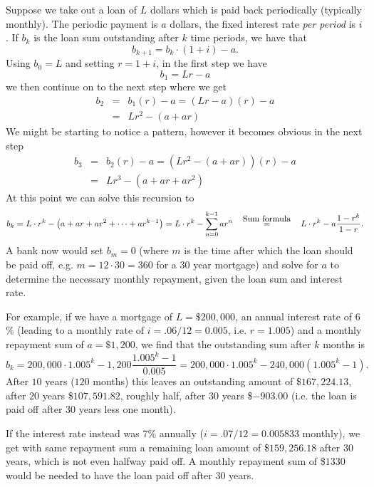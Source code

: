 \begin{Example}
Suppose we take out a loan of $L$ dollars which is paid back
periodically (typically monthly). The periodic payment is $a$
dollars, the fixed interest rate \textit{per period} is $i$. If
$b_k$ is the loan sum outstanding after $k$ time periods, we have
that
\[
b_{k+1}=b_k\cdot (1+i)-a.
\]
Using $b_0=L$ and setting $r=1+i$, in the first step we have
\[b_{1}=Lr-a\] we then continue on to the next step where we
get
\begin{eqnarray*}
b_{2}&=&b_{1}(r)-a 
=(Lr-a)(r)-a \\
&=&Lr^{2}-(a+ar)
\end{eqnarray*}
We might be starting to notice a pattern, however it becomes obvious
in the next step
\begin{eqnarray*}
b_{3}&=&b_{2}(r)-a 
=(Lr^{2}-(a+ar))(r)-a \\
&=&Lr^{3}-(a+ar+ar^{2})
\end{eqnarray*}
At this point we can solve this recursion to
\[
b_k=L\cdot r^k-\left(a+ar+ar^2+\cdots+ar^{k-1}\right)
=L\cdot r^k-\sum_{n=0}^{k-1}ar^n
\mathop{=}\limits^{\mbox{\quad Sum formula\quad}}L\cdot r^k-a\frac{1-r^k}{1-r}.
\]
A bank now would set $b_m=0$ (where $m$ is the time after which the loan
should be paid off, e.g. $m=12\cdot 30=360$ for a 30 year mortgage)
and solve for $a$ to determine the
necessary monthly repayment, given the loan sum and interest rate.

For example, if we have a mortgage of $L=\$200,000$, an annual
interest rate of $6$\% (leading to a monthly rate of
$i=.06/12=0.005$, i.e. $r=1.005$) and a monthly repayment
sum of $a=\$1,200$, we find that the outstanding sum after
$k$ months is
\[
b_k=200,000\cdot{1.005^k}-1,200\frac{1.005^k-1}{0.005}
=200,000\cdot{1.005^k}-240,000\left(1.005^k-1\right).
\]
After $10$ years ($120$ months) this leaves an outstanding amount of
{\$}$167,224.13$, after $20$ years {\$}$107,591.82$, roughly
half, after $30$
years {\$}$-903.00$ (i.e. the loan is paid off after $30$ years less
one month).

If the interest rate instead was $7$\% annually ($i=.07/12=0.005833$
monthly), we get with same repayment sum a remaining loan amount of
{\$}$159,256.18$ after $30$ years, which is not even halfway paid
off. A monthly repayment sum of {\$}$1330$ would be
needed
to have the loan paid off after $30$ years.
\end{Example}


